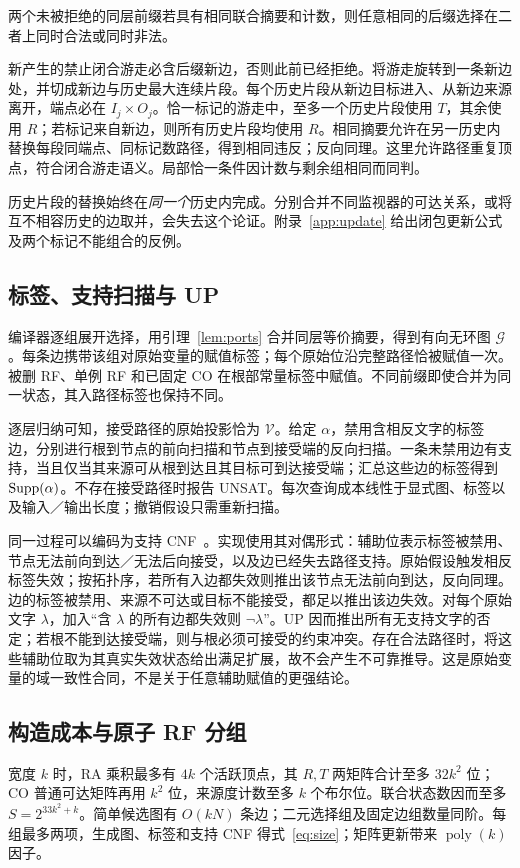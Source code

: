 \begin{clemma}[联合端口的后缀等价]\label{lem:ports}
两个未被拒绝的同层前缀若具有相同联合摘要和计数，则任意相同的后缀选择在二者上同时合法或同时非法。
\end{clemma}
\begin{cproof}
新产生的禁止闭合游走必含后缀新边，否则此前已经拒绝。将游走旋转到一条新边处，并切成新边与历史最大连续片段。每个历史片段从新边目标进入、从新边来源离开，端点必在 $I_j\times O_j$。恰一标记的游走中，至多一个历史片段使用 $T$，其余使用 $R$；若标记来自新边，则所有历史片段均使用 $R$。相同摘要允许在另一历史内替换每段同端点、同标记数路径，得到相同违反；反向同理。这里允许路径重复顶点，符合闭合游走语义。局部恰一条件因计数与剩余组相同而同判。
\end{cproof}

历史片段的替换始终在\emph{同一个}历史内完成。分别合并不同监视器的可达关系，或将互不相容历史的边取并，会失去这个论证。附录~\ref{app:update} 给出闭包更新公式及两个标记不能组合的反例。

\subsection{标签、支持扫描与 UP}
编译器逐组展开选择，用引理~\ref{lem:ports} 合并同层等价摘要，得到有向无环图 $\mathcal G$。每条边携带该组对原始变量的赋值标签；每个原始位沿完整路径恰被赋值一次。被删 RF、单例 RF 和已固定 CO 在根部常量标签中赋值。不同前缀即使合并为同一状态，其入路径标签也保持不同。

逐层归纳可知，接受路径的原始投影恰为 $\mathcal V$。给定 $\alpha$，禁用含相反文字的标签边，分别进行根到节点的前向扫描和节点到接受端的反向扫描。一条未禁用边有支持，当且仅当其来源可从根到达且其目标可到达接受端；汇总这些边的标签得到 $\mathop{\mathrm{Supp}}(\alpha)$。不存在接受路径时报告 UNSAT。每次查询成本线性于显式图、标签以及输入／输出长度；撤销假设只需重新扫描。

同一过程可以编码为支持 CNF~\cite{kucera2021}。实现使用其对偶形式：辅助位表示标签被禁用、节点无法前向到达／无法后向接受，以及边已经失去路径支持。原始假设触发相反标签失效；按拓扑序，若所有入边都失效则推出该节点无法前向到达，反向同理。边的标签被禁用、来源不可达或目标不能接受，都足以推出该边失效。对每个原始文字 $\lambda$，加入“含 $\lambda$ 的所有边都失效则 $\neg\lambda$”。UP 因而推出所有无支持文字的否定；若根不能到达接受端，则与根必须可接受的约束冲突。存在合法路径时，将这些辅助位取为其真实失效状态给出满足扩展，故不会产生不可靠推导。这是原始变量的域一致性合同，不是关于任意辅助赋值的更强结论。

\subsection{构造成本与原子 RF 分组}
宽度 $k$ 时，RA 乘积最多有 $4k$ 个活跃顶点，其 $R,T$ 两矩阵合计至多 $32k^2$ 位；CO 普通可达矩阵再用 $k^2$ 位，来源度计数至多 $k$ 个布尔位。联合状态数因而至多 $S=2^{33k^2+k}$。简单候选图有 $O(kN)$ 条边；二元选择组及固定边组数量同阶。每组最多两项，生成图、标签和支持 CNF 得式~\eqref{eq:size}；矩阵更新带来 $\operatorname{poly}(k)$ 因子。

